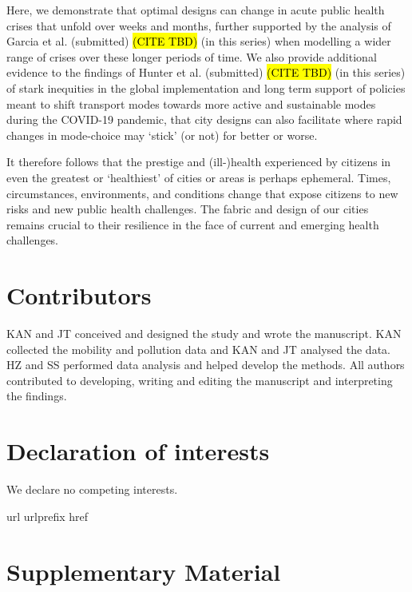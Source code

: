 \documentclass[preprint,10pt]{elsarticle} %
\newcommand{\beginsupplement}{%
        \setcounter{table}{0}
        \renewcommand{\thetable}{S\arabic{table}}%
        \setcounter{figure}{0}
        \renewcommand{\thefigure}{S\arabic{figure}}%
     }
\begin{document}
Here, we demonstrate that optimal designs can change in acute public health crises that unfold over weeks and months, further supported by the analysis of Garcia et al. (submitted) \hl{(CITE TBD)} (in this series) when modelling a wider range of crises over these longer periods of time. We also provide additional evidence to the findings of Hunter et al. (submitted) \hl{(CITE TBD)} (in this series) of stark inequities in the global implementation and long term support of policies meant to shift transport modes towards more active and sustainable modes during the COVID-19 pandemic, that city designs can also facilitate where rapid changes in mode-choice may `stick' (or not) for better or worse. 

It therefore follows that the prestige and (ill-)health experienced by citizens in even the greatest or `healthiest' of cities or areas is perhaps ephemeral. Times, circumstances, environments, and conditions change that expose citizens to new risks and new public health challenges. The fabric and design of our cities remains crucial to their resilience in the face of current and emerging health challenges.


\section*{Contributors}\label{sec:credit}
KAN and JT conceived and designed the study and wrote the manuscript. KAN collected the mobility and pollution data and KAN and JT analysed the data. HZ and SS performed data analysis and helped develop the methods. All authors contributed to developing, writing and editing the manuscript and interpreting the findings.

\section*{Declaration of interests}\label{sec:dec}
We declare no competing interests.



 
%
\expandafter\ifx\csname url\endcsname\relax
  \def\url#1{\texttt{#1}}\fi
\expandafter\ifx\csname urlprefix\endcsname\relax\def\urlprefix{URL }\fi
\expandafter\ifx\csname href\endcsname\relax
  \def\href#1#2{#2} \def\path#1{#1}\fi



\section{Supplementary Material}
\beginsupplement
\end{document}
